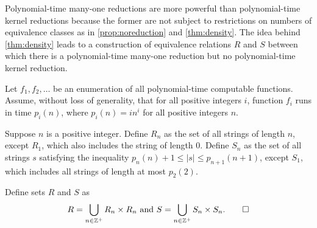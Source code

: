 

Polynomial-time many-one reductions are more powerful than polynomial-time kernel reductions because the former are not subject to restrictions on numbers of equivalence classes as in \autoref{prop:noreduction} and \autoref{thm:density}.
The idea behind \autoref{thm:density} leads to a construction of equivalence relations $R$ and $S$ between which there is a polynomial-time many-one reduction but no polynomial-time kernel reduction.

\begin{construction}\label{con:rands}
  Let $f_1, f_2, \dotsc$ be an enumeration of all polynomial-time computable functions.
  Assume, without loss of generality, that for all positive integers $i$, function $f_i$ runs in time $p_i(n)$, where $p_i(n) = i n^i$ for all positive integers $n$.

  Suppose $n$ is a positive integer.
  Define $R_n$ as the set of all strings of length $n$, except $R_1$, which also includes the string of length $0$.
  Define $S_n$ as the set of all strings $s$ satisfying the inequality $p_n(n) + 1 \leq |s| \leq p_{n + 1}(n + 1)$, except $S_1$, which includes all strings of length at most $p_2(2)$.

  Define sets $R$ and $S$ as
  \begin{equation*}
    R = \bigcup_{n \in \mathbb{Z}^+} R_n \times R_n \text{ and } S = \bigcup_{n \in \mathbb{Z}^+} S_n \times S_n.\qedhere
  \end{equation*}
\end{construction}

